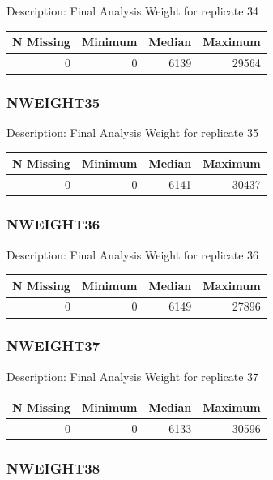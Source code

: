 \documentclass[
]{krantz}
\begin{document}
Description: Final Analysis Weight for replicate 34

\begin{tabular}[t]{r|r|r|r}
\hline
N Missing & Minimum & Median & Maximum\\
\hline
0 & 0 & 6139 & 29564\\
\hline
\end{tabular}

\hypertarget{nweight35}{%
\subsubsection*{NWEIGHT35}\label{nweight35}}


Description: Final Analysis Weight for replicate 35

\begin{tabular}[t]{r|r|r|r}
\hline
N Missing & Minimum & Median & Maximum\\
\hline
0 & 0 & 6141 & 30437\\
\hline
\end{tabular}

\hypertarget{nweight36}{%
\subsubsection*{NWEIGHT36}\label{nweight36}}


Description: Final Analysis Weight for replicate 36

\begin{tabular}[t]{r|r|r|r}
\hline
N Missing & Minimum & Median & Maximum\\
\hline
0 & 0 & 6149 & 27896\\
\hline
\end{tabular}

\hypertarget{nweight37}{%
\subsubsection*{NWEIGHT37}\label{nweight37}}


Description: Final Analysis Weight for replicate 37

\begin{tabular}[t]{r|r|r|r}
\hline
N Missing & Minimum & Median & Maximum\\
\hline
0 & 0 & 6133 & 30596\\
\hline
\end{tabular}

\hypertarget{nweight38}{%
\subsubsection*{NWEIGHT38}\label{nweight38}}
\end{document}
